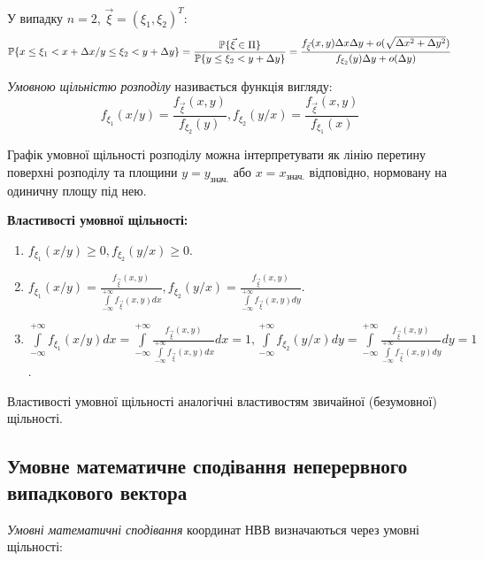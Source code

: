 У випадку $n = 2$, $\vec{\xi} = (\xi_1, \xi_2)^T$: 
\begin{equation*}
    \P\{x \leq \xi_1 < x + \Delta x / y \leq \xi_2 < y + \Delta y\} = 
    \frac{\P\{\vec{\xi} \in \Pi\}}{\P\{y \leq \xi_2 < y + \Delta y\}} = 
    \frac{f_{\vec{\xi}}(x,y)\Delta x \Delta y + 
    o(\sqrt{\Delta x^2 + \Delta y^2})}{f_{\xi_2}(y)\Delta y + o(\Delta y)}
\end{equation*}
\begin{definition}
    \emph{Умовною щільністю розподілу} називається функція 
    вигляду:
    \begin{equation*}
        f_{\xi_1}(x/y) = \frac{f_{\vec{\xi}}(x, y)}{f_{\xi_2}(y)}, f_{\xi_2}(y/x) = \frac{f_{\vec{\xi}}(x, y)}{f_{\xi_1}(x)}
    \end{equation*}
\end{definition}

\begin{remark}
    Графік умовної щільності розподілу можна інтерпретувати як лінію перетину 
    поверхні розподілу та площини $y = y_{\text{знач.}}$ або
    $x = x_{\text{знач.}}$ відповідно, нормовану на одиничну площу під нею.
\end{remark}

\noindent \textbf{Властивості умовної щільності:}
\begin{enumerate}
    \item $f_{\xi_1}(x / y) \geq 0, f_{\xi_2}(y / x) \geq 0$.
    \item $f_{\xi_1}(x/y) = \frac{f_{\vec{\xi}}(x,y)}
    {\int\limits_{-\infty}^{+\infty}f_{\vec{\xi}}(x,y)dx},
    f_{\xi_2}(y/x) = \frac{f_{\vec{\xi}}(x,y)}
    {\int\limits_{-\infty}^{+\infty}f_{\vec{\xi}}(x,y)dy}$.
    \item $\int\limits_{-\infty}^{+\infty} f_{\xi_1}(x / y) dx = 
    \int\limits_{-\infty}^{+\infty}\frac{f_{\vec{\xi}}(x,y)}
    {\int\limits_{-\infty}^{+\infty}f_{\vec{\xi}}(x,y)dx}dx = 1,
    \int\limits_{-\infty}^{+\infty} f_{\xi_2}(y / x) dy = 
    \int\limits_{-\infty}^{+\infty}\frac{f_{\vec{\xi}}(x,y)}
    {\int\limits_{-\infty}^{+\infty}f_{\vec{\xi}}(x,y)dy}dy = 1$.
\end{enumerate}
Властивості умовної щільності аналогічні властивостям звичайної (безумовної) щільності.

\subsection{Умовне математичне сподівання неперервного випадкового вектора}
\emph{Умовні математичні сподівання} координат НВВ визначаються через умовні щільності:

